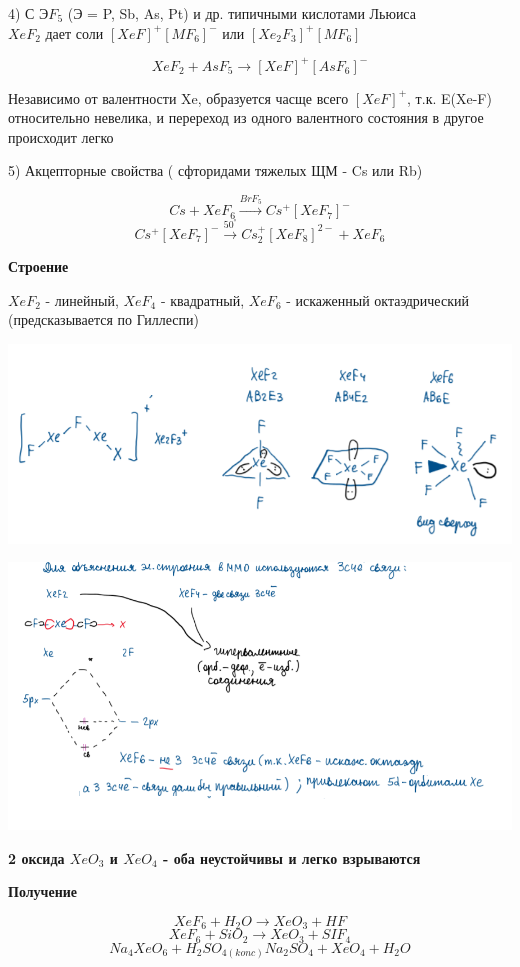 \documentclass[14pt,a4paper]{scrartcl}
\begin{document}
4) С Э$F_5$ (Э = P, Sb, As, Pt) и др. типичными кислотами Льюиса\\
$XeF_2$ дает соли $[XeF]^+[MF_6]^-$ или $[Xe_2F_3]^+[MF_6]$

$$XeF_2 + AsF_5 \rightarrow [XeF]^+[AsF_6]^-$$

Независимо от валентности Xe, образуется часще всего $[XeF]^+$, т.к. E(Xe-F) относительно невелика, и перереход из одного валентного состояния в другое происходит легко

5) Акцепторные свойства ( сфторидами тяжелых ЩМ - Cs или Rb)

$$Cs + XeF_6 \xrightarrow{BrF_5} Cs^+[XeF_7]^-$$
$$Cs^+[XeF_7]^- \xrightarrow{50^{\circ}} Cs_2^+[XeF_8]^{2-} + XeF_6$$

\textbf{Строение}

$XeF_2$ - линейный, $XeF_4$ - квадратный, $XeF_6$ - искаженный октаэдрический (предсказывается по Гиллеспи)

\includegraphics{13v2.png}

\includegraphics{13v3.png}

\textbf{2 оксида $XeO_3$ и $XeO_4$ - оба неустойчивы и легко взрываются}

\textbf{Получение}

$$XeF_6 + H_2O \rightarrow XeO_3 + HF$$
$$XeF_6 + SiO_2 \rightarrow XeO_3 + SIF_4$$
$$Na_4XeO_6 + H_2SO_{4(konc)} Na_2SO_4 + XeO_4 + H_2O$$
\end{document}
